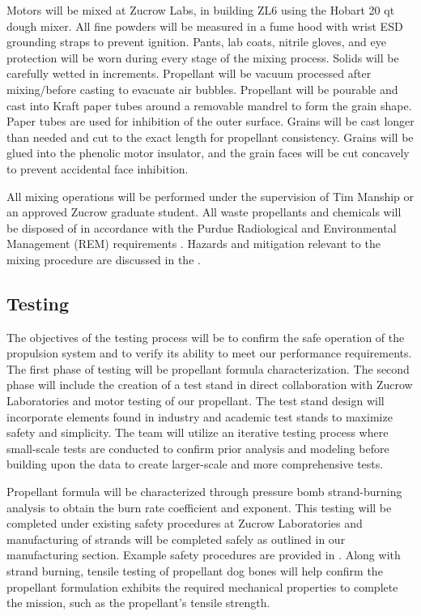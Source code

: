 Motors will be mixed at Zucrow Labs, in building ZL6 using the Hobart 20 qt dough mixer. All fine powders will be measured in a fume hood with wrist ESD grounding straps to prevent ignition. Pants, lab coats, nitrile gloves, and eye protection will be worn during every stage of the mixing process. Solids will be carefully wetted in increments. Propellant will be vacuum processed after mixing/before casting to evacuate air bubbles. Propellant will be pourable and cast into Kraft paper tubes around a removable mandrel to form the grain shape. Paper tubes are used for inhibition of the outer surface. Grains will be cast longer than needed and cut to the exact length for propellant consistency. Grains will be glued into the phenolic motor insulator, and the grain faces will be cut concavely to prevent accidental face inhibition.

All mixing operations will be performed under the supervision of Tim Manship or an approved Zucrow graduate student. All waste propellants and chemicals will be disposed of in accordance with the Purdue Radiological and Environmental Management (REM) requirements \cite{rem-disposal}. Hazards and mitigation relevant to the mixing procedure are discussed in the .


\subsection{Testing}
The objectives of the testing process will be to confirm the safe operation of the propulsion system and to verify its ability to meet our performance requirements. The first phase of testing will be propellant formula characterization. The second phase will include the creation of a test stand in direct collaboration with Zucrow Laboratories and motor testing of our propellant. The test stand design will incorporate elements found in industry and academic test stands to maximize safety and simplicity. The team will utilize an iterative testing process where small-scale tests are conducted to confirm prior analysis and modeling before building upon the data to create larger-scale and more comprehensive tests.

Propellant formula will be characterized through pressure bomb strand-burning analysis to obtain the burn rate coefficient and exponent. This testing will be completed under existing safety procedures at Zucrow Laboratories and manufacturing of strands will be completed safely as outlined in our manufacturing section. Example safety procedures are provided in . Along with strand burning, tensile testing of propellant dog bones will help confirm the propellant formulation exhibits the required mechanical properties to complete the mission, such as the propellant's tensile strength.

